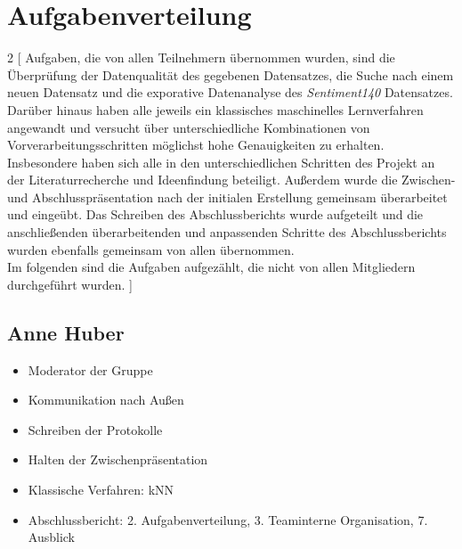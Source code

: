 \section{Aufgabenverteilung}


\begin{multicols}{2}
[
Aufgaben, die von allen Teilnehmern übernommen wurden, sind die Überprüfung der Datenqualität des gegebenen Datensatzes, die Suche nach einem neuen Datensatz und die exporative Datenanalyse des \textit{Sentiment140} Datensatzes. Darüber hinaus haben alle jeweils ein klassisches maschinelles Lernverfahren angewandt und versucht über unterschiedliche Kombinationen von Vorverarbeitungsschritten möglichst hohe Genauigkeiten zu erhalten. 
Insbesondere haben sich alle in den unterschiedlichen Schritten des Projekt an der Literaturrecherche und Ideenfindung beteiligt.
Außerdem wurde die Zwischen- und Abschlusspräsentation nach der initialen Erstellung gemeinsam überarbeitet und eingeübt. Das Schreiben des Abschlussberichts wurde aufgeteilt und die anschließenden überarbeitenden und anpassenden Schritte des Abschlussberichts wurden ebenfalls gemeinsam von allen übernommen. \\
Im folgenden sind die Aufgaben aufgezählt, die nicht von allen Mitgliedern durchgeführt wurden.
]

\subsection{Anne Huber}
\begin{itemize}
    \item Moderator der Gruppe
    \item Kommunikation nach Außen
    \item Schreiben der Protokolle
    \item Halten der Zwischenpräsentation
    \item Klassische Verfahren: kNN
    \item Abschlussbericht: 2. Aufgabenverteilung, 3. Teaminterne Organisation, 7. Ausblick
\end{itemize}



\end{multicols}
